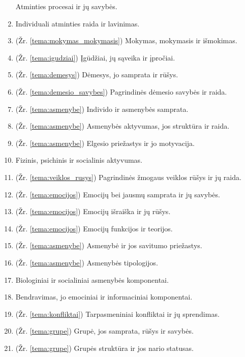 \begin{enumerate}
    Atminties procesai ir jų savybės.
  \item \label{tema_23} Individuali atminties raida ir lavinimas.
  \item \label{tema_24} (Žr. \ref{tema:mokymas_mokymasis})
  Mokymas, mokymasis ir išmokimas.
  \item \label{tema_25} (Žr. \ref{tema:igudziai})
  Įgūdžiai, jų sąveika ir įpročiai.
  \item \label{tema_26} (Žr. \ref{tema:demesys})
    Dėmesys, jo samprata ir rūšys.
  \item \label{tema_27} (Žr. \ref{tema:demesio_savybes})
    Pagrindinės dėmesio savybės ir raida.
  \item \label{tema_30} (Žr. \ref{tema:asmenybe})
  Individo ir asmenybės samprata.
  \item \label{tema_31} (Žr. \ref{tema:asmenybe}) 
  Asmenybės aktyvumas, jos struktūra ir raida.
  \item \label{tema_32} (Žr. \ref{tema:asmenybe})
  Elgesio priežastys ir jo motyvacija.
  \item \label{tema_33} Fizinis, psichinis ir socialinis aktyvumas.
  \item \label{tema_34} (Žr. \ref{tema:veiklos_rusys})
  Pagrindinės žmogaus veiklos rūšys ir jų raida.
  \item \label{tema_35} (Žr. \ref{tema:emocijos})
  Emocijų bei jausmų samprata ir jų savybės.
  \item \label{tema_36} (Žr. \ref{tema:emocijos})
  Emocijų išraiška ir jų rūšys.
  \item \label{tema_37} (Žr. \ref{tema:emocijos})
  Emocijų funkcijos ir teorijos.
  \item \label{tema_40} (Žr. \ref{tema:asmenybe})
  Asmenybė ir jos savitumo priežastys.
  \item \label{tema_41} (Žr. \ref{tema:asmenybe})
  Asmenybės tipologijos.
  \item \label{tema_42} Biologiniai ir socialiniai asmenybės komponentai.
  \item \label{tema_43} Bendravimas, jo emociniai ir 
    informaciniai komponentai.
  \item \label{tema_44} (Žr. \ref{tema:konfliktai})
  Tarpasmeniniai konfliktai ir jų sprendimas.
  \item \label{tema_45} (Žr. \ref{tema:grupe})
  Grupė, jos samprata, rūšys ir savybės.
  \item \label{tema_46} (Žr. \ref{tema:grupe})
  Grupės struktūra ir jos nario statusas.
\end{enumerate}
